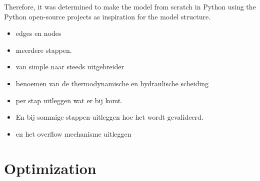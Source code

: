 Therefore, it was determined to make the model from scratch in Python using the Python open-source projects as inspiration for the model structure.




\begin{itemize}
\item edges en nodes
\item meerdere stappen.
\item van simple naar steeds uitgebreider
\item benoemen van de thermodynamische en hydraulische scheiding 
\item per stap uitleggen wat er bij komt.
\item En bij sommige stappen uitleggen hoe het wordt gevalideerd.
\item en het overflow mechanisme uitleggen
\end{itemize}



\section{Optimization}

